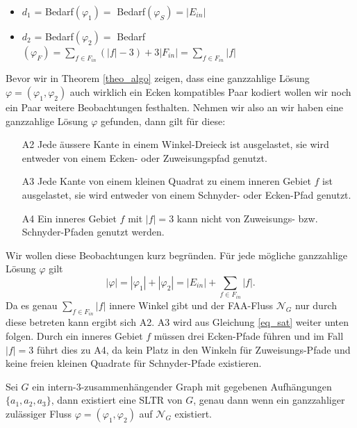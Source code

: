 \begin{itemize}
\item $d_1$ = Bedarf$(\varphi_1) = $ Bedarf$(\varphi_S) = |E_{in}|$
\item $d_2$ = Bedarf$(\varphi_2) = $ Bedarf$(\varphi_F) =  \sum_{f \in F_{in}}(|f|-3) + 3|F_{in}| = \sum_{f \in F_{in}} |f|$
\end{itemize}

Bevor wir in Theorem \ref{theo_algo} zeigen, dass eine ganzzahlige Lösung $\varphi=(\varphi_1,\varphi_2)$ auch wirklich ein Ecken kompatibles Paar kodiert wollen wir noch ein Paar weitere Beobachtungen festhalten. Nehmen wir also an wir haben eine ganzzahlige Lösung $\varphi$ gefunden, dann gilt für diese:
\begin{itemize}
\item [A2] Jede äussere Kante in einem Winkel-Dreieck ist ausgelastet, sie wird entweder von einem Ecken- oder Zuweisungspfad genutzt.
\item [A3] Jede Kante von einem kleinen Quadrat zu einem inneren Gebiet $f$ ist ausgelastet, sie wird entweder von einem Schnyder- oder Ecken-Pfad genutzt.
\item [A4] Ein inneres Gebiet $f$ mit $|f|=3$ kann nicht von Zuweisungs- bzw. Schnyder-Pfaden genutzt werden.
\end{itemize}

Wir wollen diese Beobachtungen kurz begründen. Für jede mögliche ganzzahlige Lösung $\varphi$ gilt $$|\varphi|=|\varphi_1|+|\varphi_2| = |E_{in}| + \sum_{f \in F_{in}} |f|.$$
Da es genau $\sum_{f \in F_{in}} |f|$ innere Winkel gibt und der FAA-Fluss $\mathcal{N}_G$ nur durch diese betreten kann ergibt sich A2. A3 wird aus Gleichung \ref{eq_sat} weiter unten folgen. Durch ein inneres Gebiet $f$ müssen drei Ecken-Pfade führen und im Fall $|f|=3$ führt dies zu A4, da kein Platz in den Winkeln für Zuweisungs-Pfade und keine freien kleinen Quadrate für Schnyder-Pfade existieren.

\begin{theorem}\label{theo_algo}
Sei $G$ ein intern-3-zusammenhängender Graph mit gegebenen Aufhängungen $\{a_1,a_2,a_3\}$, dann existiert eine SLTR von $G$, genau dann wenn ein ganzzahliger zulässiger Fluss $\varphi=(\varphi_1,\varphi_2)$ auf $\mathcal{N}_G$ existiert.
\end{theorem}

